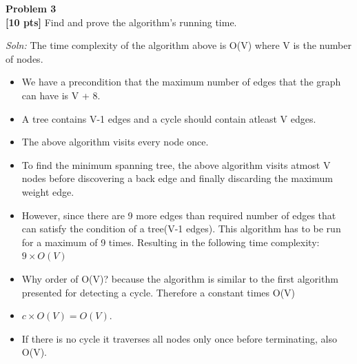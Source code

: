 \documentclass{article}
\newenvironment{problem}[2][Problem]
    { \begin{mdframed}[backgroundcolor=gray!20] \textbf{#1 #2} \\}
    {  \end{mdframed}}
\newenvironment{solution}
    {\textit{Soln:}}
    {}
\begin{document}
\begin{problem}{3}
\textbf{[10 pts]} Find and prove the algorithm's running time.
\end{problem}
\begin{solution}
The time complexity of the algorithm above is O(V) where V is the number of nodes.
\begin{itemize}
\item We have a precondition that the maximum number of edges that the graph can have is V + 8.
\item 
A tree contains V-1 edges and a cycle should contain atleast V edges.
\item The above algorithm visits every node once.
\item To find the minimum spanning tree, the above algorithm visits atmost V nodes before discovering a back edge and finally discarding the maximum weight edge.
\item However, since there are 9 more edges than required number of edges that can satisfy the condition of a tree(V-1 edges). This algorithm has to be run for a maximum of 9 times. Resulting in the following time complexity:
$9 \times O(V)$

\item Why order of O(V)? because the algorithm is similar to the first algorithm presented for detecting a cycle.
Therefore a constant times O(V) 
\item $c \times O(V) = O(V)$.
\item If there is no cycle it traverses all nodes only once before terminating, also O(V).
\end{itemize}
\end{solution}
\end{document}
